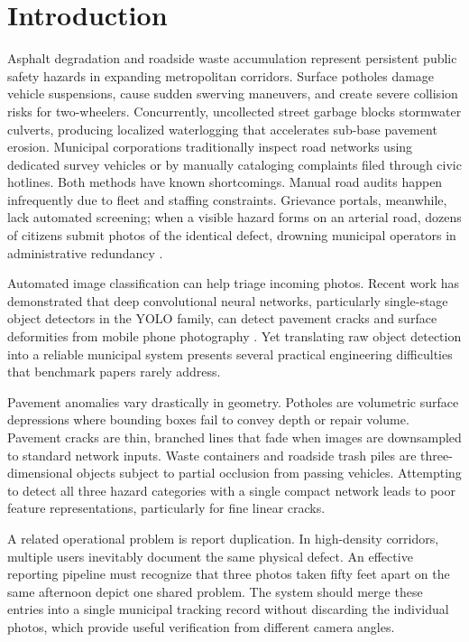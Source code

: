 \section{Introduction}
Asphalt degradation and roadside waste accumulation represent persistent public safety hazards in expanding metropolitan corridors. Surface potholes damage vehicle suspensions, cause sudden swerving maneuvers, and create severe collision risks for two-wheelers. Concurrently, uncollected street garbage blocks stormwater culverts, producing localized waterlogging that accelerates sub-base pavement erosion. Municipal corporations traditionally inspect road networks using dedicated survey vehicles or by manually cataloging complaints filed through civic hotlines. Both methods have known shortcomings. Manual road audits happen infrequently due to fleet and staffing constraints. Grievance portals, meanwhile, lack automated screening; when a visible hazard forms on an arterial road, dozens of citizens submit photos of the identical defect, drowning municipal operators in administrative redundancy \cite{r01, r02}.

Automated image classification can help triage incoming photos. Recent work has demonstrated that deep convolutional neural networks, particularly single-stage object detectors in the YOLO family, can detect pavement cracks and surface deformities from mobile phone photography \cite{r03, r04, r05}. Yet translating raw object detection into a reliable municipal system presents several practical engineering difficulties that benchmark papers rarely address.

Pavement anomalies vary drastically in geometry. Potholes are volumetric surface depressions where bounding boxes fail to convey depth or repair volume. Pavement cracks are thin, branched lines that fade when images are downsampled to standard network inputs. Waste containers and roadside trash piles are three-dimensional objects subject to partial occlusion from passing vehicles. Attempting to detect all three hazard categories with a single compact network leads to poor feature representations, particularly for fine linear cracks.

A related operational problem is report duplication. In high-density corridors, multiple users inevitably document the same physical defect. An effective reporting pipeline must recognize that three photos taken fifty feet apart on the same afternoon depict one shared problem. The system should merge these entries into a single municipal tracking record without discarding the individual photos, which provide useful verification from different camera angles.

